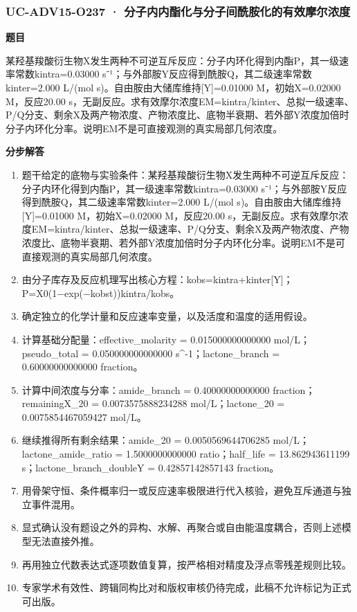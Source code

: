 \documentclass[UTF8,11pt,a4paper]{ctexart}
\begin{document}
\subsubsection*{UC-ADV15-O237 · 分子内内酯化与分子间酰胺化的有效摩尔浓度}
\noindent\textbf{题目}\par
某羟基羧酸衍生物X发生两种不可逆互斥反应：分子内环化得到内酯P，其一级速率常数kintra=0.03000 s⁻¹；与外部胺Y反应得到酰胺Q，其二级速率常数kinter=2.000 L/(mol s)。自由胺由大储库维持[Y]=0.01000 M，初始X=0.02000 M，反应20.00 s，无副反应。求有效摩尔浓度EM=kintra/kinter、总拟一级速率、P/Q分支、剩余X及两产物浓度、产物浓度比、底物半衰期、若外部Y浓度加倍时分子内环化分率。说明EM不是可直接观测的真实局部几何浓度。\par
\medskip\noindent\textbf{分步解答}
\begin{enumerate}
\item 题干给定的底物与实验条件：某羟基羧酸衍生物X发生两种不可逆互斥反应：分子内环化得到内酯P，其一级速率常数kintra=0.03000 s⁻¹；与外部胺Y反应得到酰胺Q，其二级速率常数kinter=2.000 L/(mol s)。自由胺由大储库维持[Y]=0.01000 M，初始X=0.02000 M，反应20.00 s，无副反应。求有效摩尔浓度EM=kintra/kinter、总拟一级速率、P/Q分支、剩余X及两产物浓度、产物浓度比、底物半衰期、若外部Y浓度加倍时分子内环化分率。说明EM不是可直接观测的真实局部几何浓度。
\item 由分子库存及反应机理写出核心方程：kobs=kintra+kinter[Y]；P=X0(1−exp(−kobst))kintra/kobs。
\item 确定独立的化学计量和反应速率变量，以及活度和温度的适用假设。
\item 计算基础分配量：effective\_molarity = 0.015000000000000 mol/L；pseudo\_total = 0.050000000000000 s\textasciicircum{}-1；lactone\_branch = 0.60000000000000 fraction。
\item 计算中间浓度与分率：amide\_branch = 0.40000000000000 fraction；remainingX\_20 = 0.0073575888234288 mol/L；lactone\_20 = 0.0075854467059427 mol/L。
\item 继续推得所有剩余结果：amide\_20 = 0.0050569644706285 mol/L；lactone\_amide\_ratio = 1.5000000000000 ratio；half\_life = 13.862943611199 s；lactone\_branch\_doubleY = 0.42857142857143 fraction。
\item 用骨架守恒、条件概率归一或反应速率极限进行代入核验，避免互斥通道与独立事件混用。
\item 显式确认没有题设之外的异构、水解、再聚合或自由能温度耦合，否则上述模型无法直接外推。
\item 再用独立代数表达式逐项数值复算，按严格相对精度及浮点零残差规则比较。
\item 专家学术有效性、跨辑同构比对和版权审核仍待完成，此稿不允许标记为正式可出版。
\end{enumerate}
\end{document}
